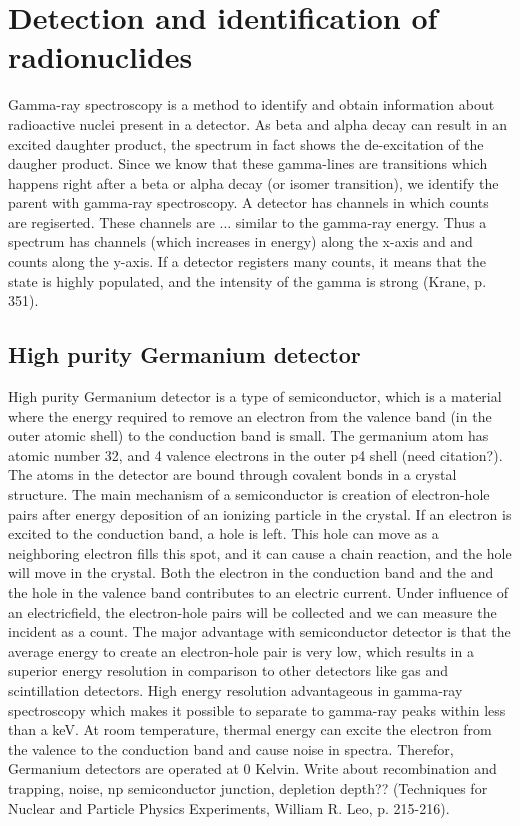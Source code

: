 \section{Detection and identification of radionuclides}
Gamma-ray spectroscopy is a method to identify and obtain information about radioactive nuclei present in a detector. As beta and alpha decay can result in an excited daughter product, the spectrum in fact shows the de-excitation of the daugher product. Since we know that these gamma-lines are transitions which happens right after a beta or alpha decay (or isomer transition), we identify the parent with gamma-ray spectroscopy. A detector has channels in which counts are regiserted. These channels are ... similar to the gamma-ray energy. Thus a spectrum has channels (which increases in energy) along the x-axis and and counts along the y-axis. If a detector registers many counts, it means that the state is highly populated, and the intensity of the gamma is strong (Krane, p. 351). 



\subsection{High purity Germanium detector}
High purity Germanium detector is a type of semiconductor, which is a material where the energy required to remove an electron from the valence band (in the outer atomic shell) to the conduction band is small. The germanium atom has atomic number 32, and 4 valence electrons in the outer p4 shell (need citation?). The atoms in the detector are bound through covalent bonds in a crystal structure. The main mechanism of a semiconductor is creation of electron-hole pairs after energy deposition of an ionizing particle in the crystal. If an electron is excited to the conduction band, a hole is left. This hole can move as a neighboring electron fills this spot, and it can cause a chain reaction, and the hole will move in the crystal. Both the electron in the conduction band and the  and the hole in the valence band contributes to an electric current. Under influence of an electricfield, the electron-hole pairs will be collected and we can measure the incident as a count. The major
advantage with semiconductor detector is that the average energy to create an electron-hole pair is
very low, which results in a superior energy resolution in comparison to other detectors like gas and
scintillation detectors. High energy resolution advantageous in gamma-ray spectroscopy which makes
it possible to separate to gamma-ray peaks within less than a keV. At room temperature, thermal
energy can excite the electron from the valence to the conduction band and cause noise in spectra.
Therefor, Germanium detectors are operated at 0 Kelvin. Write about recombination and trapping,
noise, np semiconductor junction, depletion depth?? (Techniques for Nuclear and Particle Physics Experiments, William R. Leo, p. 215-216). 


